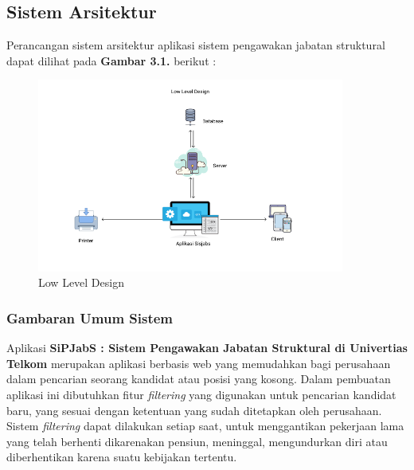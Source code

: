 \chapter{\babTiga}

\section{Sistem Arsitektur}

Perancangan sistem arsitektur aplikasi sistem pengawakan jabatan struktural dapat dilihat pada \textbf{Gambar 3.1.} berikut : 

\begin{figure}
	\centering
	\includegraphics[width=0.9\textwidth]
	{pics/LowLevelDiagram.png}
	\caption{Low Level Design}
	\label{fig:31}
\end{figure}


\subsection{Gambaran Umum Sistem}

Aplikasi \textbf{SiPJabS : Sistem Pengawakan Jabatan Struktural di Univertias Telkom} merupakan aplikasi berbasis web yang memudahkan bagi perusahaan dalam pencarian seorang kandidat atau posisi yang kosong. Dalam pembuatan aplikasi ini dibutuhkan fitur \textit{filtering} yang digunakan untuk pencarian kandidat baru, yang sesuai dengan ketentuan yang sudah ditetapkan oleh perusahaan. Sistem \textit{filtering} dapat dilakukan setiap saat, untuk menggantikan pekerjaan lama yang telah berhenti dikarenakan pensiun, meninggal, mengundurkan diri atau diberhentikan karena suatu kebijakan tertentu.

